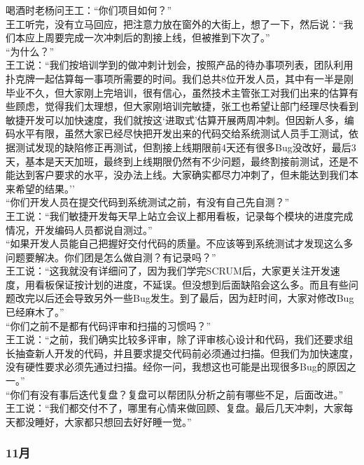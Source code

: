 \documentclass[]{article}
\begin{document}
喝酒时老杨问王工：``你们项目如何？''\\
王工听完，没有立马回应，把注意力放在窗外的大街上，想了一下，然后说：``我们本应上周要完成一次冲刺后的割接上线，但被推到下次了。''\\
``为什么？''\\
王工说：``我们按培训学到的做冲刺计划会，按照产品的待办事项列表，团队利用扑克牌一起估算每一事项所需要的时间。我们总共8位开发人员，其中有一半是刚毕业不久，但大家刚上完培训，很有信心，虽然技术主管张工对我们出来的估算有些顾虑，觉得我们太理想，但大家刚培训完敏捷，张工也希望让部门经理尽快看到敏捷开发可以加快速度，我们就按这`进取式'估算开展两周冲刺。但因新人多，编码水平有限，虽然大家已经尽快把开发出来的代码交给系统测试人员手工测试，依据测试发现的缺陷修正再测试，但割接上线期限前4天还有很多Bug没改好，最后3天，基本是天天加班，最终到上线期限仍然有不少问题，最终割接前测试，还是不能达到客户要求的水平，没办法上线。大家确实都尽力冲刺了，但未能达到我们本来希望的结果。''\\
``你们开发人员在提交代码到系统测试之前，有没有自己先自测？''\\
王工说：``我们敏捷开发每天早上站立会议上都用看板，记录每个模块的进度完成情况，开发编码人员都说自测过。''\\
``如果开发人员能自己把握好交付代码的质量。不应该等到系统测试才发现这么多问题要解决。你们团是怎么做自测？有记录吗？''\\
王工说：``这我就没有详细问了，因为我们学完SCRUM后，大家更关注开发速度，用看板保证按计划的进度，不延误。但没想到后面缺陷会这么多。而且有些问题改完以后还会导致另外一些Bug发生。到了最后，因为赶时间，大家对修改Bug已经麻木了。''\\
``你们之前不是都有代码评审和扫描的习惯吗？''\\
王工说：``之前，我们确实比较多评审，除了评审核心设计和代码，我们还要求组长抽查新人开发的代码，并且要求提交代码前必须通过扫描。但我们为加快速度，没有硬性要求必须先通过扫描。经你一问，我想这也可能是出现很多Bug的原因之一。''\\
``你们有没有事后迭代复盘？复盘可以帮团队分析之前有哪些不足，后面改进。''\\
王工说：``我们都交付不了，哪里有心情来做回顾、复盘。最后几天冲刺，大家每天都没睡好，大家都只想回去好好睡一觉。''\\

\hypertarget{ux6708-4}{%
\subsubsection{11月}\label{ux6708-4}}
\end{document}
